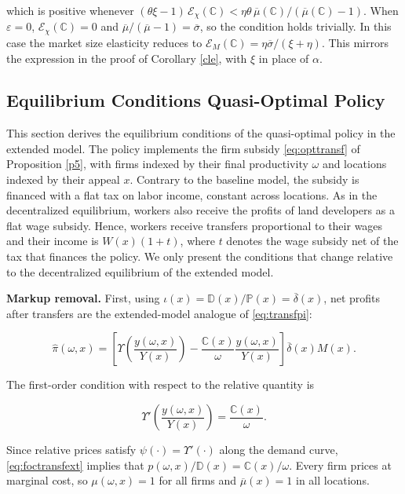 which is positive whenever $(\theta\xi - 1)\,\mathcal{E}_{\chi}(\mathbb{C}) < \eta\theta\, \overline{\mu}(\mathbb{C})/(\overline{\mu}(\mathbb{C})-1)$. When $\varepsilon = 0$, $\mathcal{E}_{\chi}(\mathbb{C}) = 0$ and $\overline{\mu}/(\overline{\mu}-1) = \overline{\sigma}$, so the condition holds trivially. In this case the market size elasticity reduces to $\mathcal{E}_M(\mathbb{C}) = \eta \overline{\sigma}/(\xi + \eta)$. This mirrors the expression in the proof of Corollary \ref{cle}, with $\xi$ in place of $\alpha$.

\subsection{Equilibrium Conditions Quasi-Optimal Policy}\label{a:qopext}
This section derives the equilibrium conditions of the quasi-optimal policy in the extended model. The policy implements the firm subsidy \eqref{eq:opttransf} of Proposition \ref{p5}, with firms indexed by their final productivity $\omega$ and locations indexed by their appeal $x$. Contrary to the baseline model, the subsidy is financed with a flat tax on labor income, constant across locations. As in the decentralized equilibrium, workers also receive the profits of land developers as a flat wage subsidy. Hence, workers receive transfers proportional to their wages and their income is $W(x)(1+t)$, where $t$ denotes the wage subsidy net of the tax that finances the policy. We only present the conditions that change relative to the decentralized equilibrium of the extended model.

\textbf{Markup removal.} First, using $\iota(x) = \mathbb{D}(x)/\mathbb{P}(x) = \overline{\delta}(x)$, net profits after transfers are the extended-model analogue of \eqref{eq:transfpi}:

\begin{equation}\label{eq:transfpiext}
	\widehat{\pi}(\omega, x) = \left[\Upsilon\left(\frac{y(\omega,x)}{Y(x)}\right) - \frac{\mathbb{C}(x)}{\omega} \frac{y(\omega,x)}{Y(x)} \right]\overline{\delta}(x) M(x).
\end{equation}

The first-order condition with respect to the relative quantity is

\begin{equation}\label{eq:foctransfext}
	\Upsilon'\left(\frac{y(\omega,x)}{Y(x)}\right) = \frac{\mathbb{C}(x)}{\omega}.
\end{equation}

Since relative prices satisfy $\psi(\cdot) = \Upsilon'(\cdot)$ along the demand curve, \eqref{eq:foctransfext} implies that $p(\omega,x)/\mathbb{D}(x) = \mathbb{C}(x)/\omega$. Every firm prices at marginal cost, so $\mu(\omega,x) = 1$ for all firms and $\overline{\mu}(x) = 1$ in all locations.

